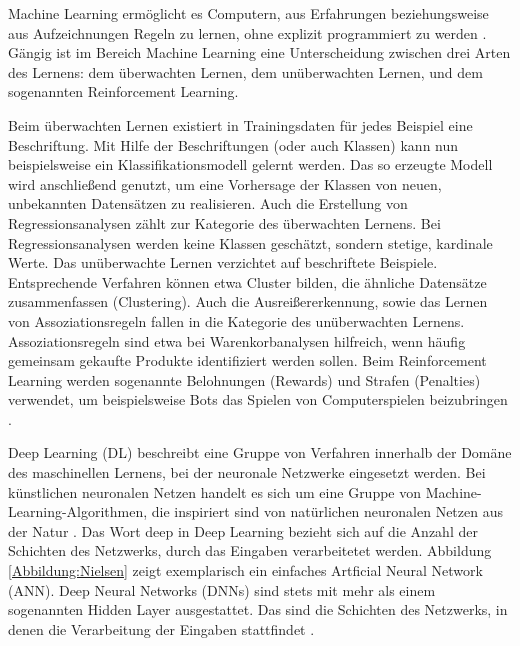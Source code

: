 Machine Learning ermöglicht es Computern, aus Erfahrungen beziehungsweise aus Aufzeichnungen Regeln zu lernen, ohne explizit programmiert zu werden \cite{samuel}. Gängig ist im Bereich Machine Learning eine Unterscheidung zwischen drei Arten des Lernens: dem überwachten Lernen, dem unüberwachten Lernen, und dem sogenannten Reinforcement Learning. 

Beim überwachten Lernen existiert in Trainingsdaten für jedes Beispiel eine Beschriftung. Mit Hilfe der Beschriftungen (oder auch Klassen) kann nun beispielsweise ein Klassifikationsmodell gelernt werden. Das so erzeugte Modell wird anschließend genutzt, um eine Vorhersage der Klassen von neuen, unbekannten Datensätzen zu realisieren. Auch die Erstellung von Regressionsanalysen zählt zur Kategorie des überwachten Lernens. Bei Regressionsanalysen werden keine Klassen geschätzt, sondern stetige, kardinale Werte. Das unüberwachte Lernen verzichtet auf beschriftete Beispiele. Entsprechende Verfahren können etwa Cluster bilden, die ähnliche Datensätze zusammenfassen (Clustering). Auch die Ausreißererkennung, sowie das Lernen von Assoziationsregeln fallen in die Kategorie des unüberwachten Lernens. Assoziationsregeln sind etwa bei Warenkorbanalysen hilfreich, wenn häufig gemeinsam gekaufte Produkte identifiziert werden sollen. Beim Reinforcement Learning werden sogenannte Belohnungen (Rewards) und Strafen (Penalties) verwendet, um beispielsweise Bots das Spielen von Computerspielen beizubringen \cite[S. 7-15]{Geron}.

Deep Learning (DL) beschreibt eine Gruppe von Verfahren innerhalb der Domäne des maschinellen Lernens, bei der neuronale Netzwerke eingesetzt werden. Bei künstlichen neuronalen Netzen handelt es sich um eine Gruppe von Machine-Learning-Algorithmen, die inspiriert sind von natürlichen neuronalen Netzen aus der Natur \cite[S. 2]{White}. Das Wort deep in Deep Learning bezieht sich auf die Anzahl der Schichten des Netzwerks, durch das Eingaben verarbeitetet werden. Abbildung \ref{Abbildung:Nielsen} zeigt exemplarisch ein einfaches Artficial Neural Network (ANN). Deep Neural Networks (DNNs) sind stets mit mehr als einem sogenannten Hidden Layer ausgestattet. Das sind die Schichten des Netzwerks, in denen die Verarbeitung der Eingaben stattfindet \cite{Nielsen}. 

